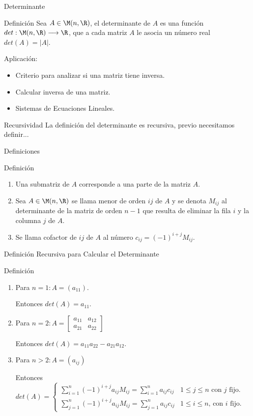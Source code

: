 {Determinante}

\begin{block}{Definición}
Sea $A \in \M(n,\R)$, el determinante de $A$ es una función 
$det: \M(n,\R) \longrightarrow \R$, que a cada matriz $A$ le asocia un número real $det(A) = |A|$.
\end{block}

Aplicación:

\begin{itemize}
\item
Criterio para analizar si  una matriz tiene inversa.
\item
Calcular inversa de una matriz.
\item
Sistemas de Ecuaciones Lineales.
\end{itemize}

\begin{alertblock}{Recursividad}
La definición del determinante es recursiva, previo necesitamos definir...
\end{alertblock}


{Definiciones}

\begin{block}{Definición}
\begin{enumerate}
\item
Una submatriz de $A$ corresponde a una parte de la matriz  $A$.
\item
Sea $A \in \M(n,\R)$ se llama menor de orden $ij$ de $A$ y se denota $M_{ij}$ al determinante de la matriz de orden $n-1$ que resulta de eliminar la fila $i$ y la columna $j$ de $A$.
\item
Se llama cofactor de $ij$ de $A$ al número $c_{ij} = (-1)^{i+j} M_{ij}$.
\end{enumerate}
\end{block}


{Definición Recursiva para Calcular el Determinante}

\begin{block}{Definición}
\begin{enumerate}
\item
Para $n=1:
A=(a_{11})$.

Entonces $det(A) = a_{11}$.

\item
Para $n=2: 
A= \begin{bmatrix}
a_{11} &  a_{12} \\
a_{21} &  a_{22}
\end{bmatrix}
$

Entonces 
$det(A) = a_{11}a_{22} - a_{21}a_{12}$.

\item
Para $n>2:
A=(a_{ij})$

Entonces
$det(A) =
\left\{ \begin{array}{rl}
\sum_{i=1}^n (-1)^{i+j}a_{ij} M_{ij}  = \sum_{i=1}^n a_{ij} c_{ij}
&1\leq j  \leq n \mbox{ con }j \mbox{ fijo.}  \\ 
\sum_{j=1}^n (-1)^{i+j}a_{ij} M_{ij}  =   \sum_{j=1}^n a_{ij} c_{ij} 
& 1\leq i \leq n \mbox{, con } i \mbox{ fijo.}
\end{array}\right.
$
\end{enumerate}
\end{block}


